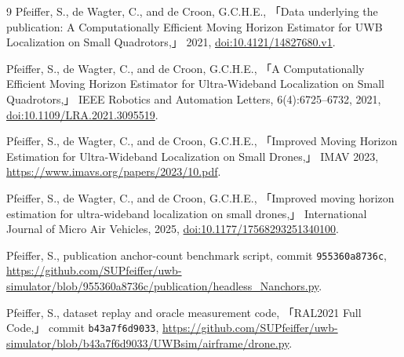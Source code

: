 \documentclass[11pt,a4paper]{ctexart}
\begin{document}
\begingroup
\raggedright
\begin{thebibliography}{9}
Pfeiffer, S., de Wagter, C., and de Croon, G.C.H.E.,
「Data underlying the publication: A Computationally Efficient Moving Horizon
Estimator for UWB Localization on Small Quadrotors,」 2021,
\href{https://doi.org/10.4121/14827680.v1}{doi:10.4121/14827680.v1}.

Pfeiffer, S., de Wagter, C., and de Croon, G.C.H.E.,
「A Computationally Efficient Moving Horizon Estimator for Ultra-Wideband
Localization on Small Quadrotors,」 IEEE Robotics and Automation Letters,
6(4):6725--6732, 2021,
\href{https://doi.org/10.1109/LRA.2021.3095519}{doi:10.1109/LRA.2021.3095519}.

Pfeiffer, S., de Wagter, C., and de Croon, G.C.H.E.,
「Improved Moving Horizon Estimation for Ultra-Wideband Localization on Small
Drones,」 IMAV 2023,
\url{https://www.imavs.org/papers/2023/10.pdf}.

Pfeiffer, S., de Wagter, C., and de Croon, G.C.H.E.,
「Improved moving horizon estimation for ultra-wideband localization on small
drones,」 International Journal of Micro Air Vehicles, 2025,
\href{https://doi.org/10.1177/17568293251340100}{doi:10.1177/17568293251340100}.

Pfeiffer, S., publication anchor-count benchmark script, commit
\texttt{955360a8736c},
\url{https://github.com/SUPfeiffer/uwb-simulator/blob/955360a8736c/publication/headless_Nanchors.py}.

Pfeiffer, S., dataset replay and oracle measurement code, 「RAL2021 Full Code,」
commit \texttt{b43a7f6d9033},
\url{https://github.com/SUPfeiffer/uwb-simulator/blob/b43a7f6d9033/UWBsim/airframe/drone.py}.
\end{thebibliography}
\endgroup
\end{document}
